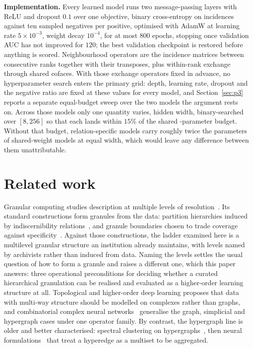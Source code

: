 \documentclass[conference]{IEEEtran}
\begin{document}
\textbf{Implementation.} Every learned model runs two message-passing layers with ReLU and
dropout $0.1$ over one objective, binary cross-entropy on incidences against ten sampled
negatives per positive, optimised with AdamW at learning rate
$5\times10^{-3}$, weight
decay $10^{-4}$, for at most $800$ epochs, stopping once validation AUC has not improved for
$120$; the best validation checkpoint is restored before anything is scored. Neighbourhood
operators are the incidence matrices between consecutive ranks together with their
transposes, plus within-rank exchange through shared cofaces. With those exchange operators
fixed in
advance, no hyperparameter search enters
the primary grid: depth, learning rate, dropout and the negative ratio are fixed at these
values for every model, and Section~\ref{sec:p3} reports a separate equal-budget sweep over
the two models the argument rests on. Across those models only one quantity varies, hidden
width,
binary-searched over $[8,256]$ so
that each lands within $15\%$ of the shared \paramBudget{}-parameter budget.
Without that budget, relation-specific models carry roughly twice the parameters of
shared-weight models
at equal width, which would leave any difference between them unattributable.

\section{Related work}
\label{sec:related}

Granular computing studies description at multiple levels of
resolution~\citep{zadeh1997granulation,yao2005perspectives}. Its standard constructions form
granules from the data: partition hierarchies induced by indiscernibility
relations~\citep{pawlak1982rough}, and granule boundaries chosen to trade coverage against
specificity~\citep{pedrycz2013justifiable}. Against those constructions, the ladder
examined here is a
multilevel granular structure an institution already maintains, with levels named by
archivists rather than induced from data. Naming the levels settles the usual question of how
to form a
granule and raises a different one, which this paper answers: three operational preconditions
for deciding whether a curated hierarchical granulation can be realised and evaluated as a
higher-order learning structure at all.
Topological and higher-order deep learning proposes that data with multi-way structure
should be modelled on complexes rather than graphs, and combinatorial complex neural
networks~\citep{hajij2023tdl} generalise the graph, simplicial and hypergraph cases under one
operator family. By contrast, the hypergraph line is older and better characterised: spectral
clustering on hypergraphs~\citep{zhou2006hypergraph}, then neural
formulations~\citep{chien2022allset,wang2023edhnn} that treat a hyperedge as a multiset to be
aggregated.
\end{document}
